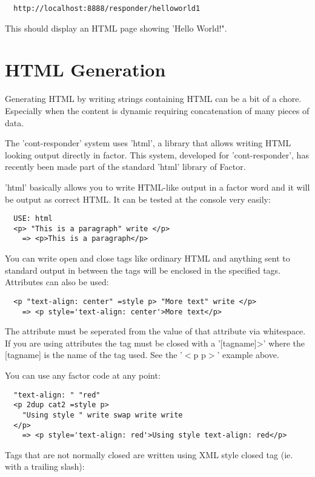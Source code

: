 \begin{verbatim}
  http://localhost:8888/responder/helloworld1
\end{verbatim}

This should display an HTML page showing 'Hello World!".

\section{HTML Generation}

Generating HTML by writing strings containing HTML can be a bit of a
chore. Especially when the content is dynamic requiring concatenation
of many pieces of data. 

The 'cont-responder' system uses 'html', a library that allows writing
HTML looking output directly in factor. This system, developed for
'cont-responder', has recently been made part of the standard 'html'
library of Factor.

'html' basically allows you to write HTML-like output in a factor word
and it will be output as correct HTML. It can be tested at the console
very easily:

\begin{verbatim}
  USE: html
  <p> "This is a paragraph" write </p>
    => <p>This is a paragraph</p>
\end{verbatim}

You can write open and close tags like ordinary HTML and anything sent
to standard output in between the tags will be enclosed in the
specified tags. Attributes can also be used:

\begin{verbatim}
  <p "text-align: center" =style p> "More text" write </p>
    => <p style='text-align: center'>More text</p>
\end{verbatim}

The attribute must be seperated from the value of that attribute via
whitespace. If you are using attributes the tag must be closed with a
'[tagname]>' where the [tagname] is the name of the tag used. See the
'$<$p p$>$' example above.

You can use any factor code at any point:
 
\begin{verbatim}
  "text-align: " "red" 
  <p 2dup cat2 =style p> 
    "Using style " write swap write write
  </p>
    => <p style='text-align: red'>Using style text-align: red</p>
\end{verbatim}

Tags that are not normally closed are written using XML style closed
tag (ie. with a trailing slash):

